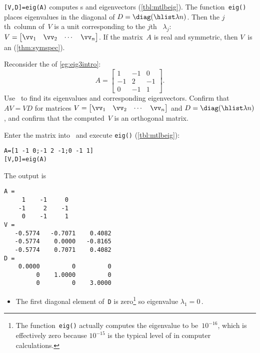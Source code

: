 \begin{compute}
\verb|[V,D]=eig(A)| computes s and eigenvectors (\cref{tbl:mtlbeig}).
The function~\verb|eig()| places eigenvalues in the diagonal of \(D=\diag(\hlist\lambda n)\). 
Then the \(j\)th~column of~\(V\) is a unit  corresponding to the \(j\)th ~\(\lambda_j\):
\(V=\begin{bmatrix} \vv_1&\vv_2&\cdots&\vv_n \end{bmatrix}\).
If the matrix~\(A\) is real and symmetric, then \(V\)~is an  (\cref{thm:symspec}).
\end{compute}

\begin{example} \label{eg:eig3eig}
Reconsider the  of \cref{eg:eig3intro}:
\begin{equation*}
A=\begin{bmatrix} 1&-1&0\\-1&2&-1\\0&-1&1 \end{bmatrix}.
\end{equation*}
Use \script\ to find its eigenvalues and corresponding eigenvectors.
Confirm that \(AV=VD\) for matrices \(V=\begin{bmatrix} \vv_1&\vv_2&\cdots&\vv_n \end{bmatrix}\) and \(D=\diag(\hlist\lambda n)\), and confirm that the computed~\(V\) is an orthogonal matrix.
\begin{solution} 
Enter the matrix into \script\ and execute \verb|eig()| (\cref{tbl:mtlbeig}):
\setbox\ajrqrbox\hbox{}%
\marginajrbox%
\begin{verbatim}
A=[1 -1 0;-1 2 -1;0 -1 1]
[V,D]=eig(A)
\end{verbatim}
The output is
\begin{verbatim}
A =
     1    -1     0
    -1     2    -1
     0    -1     1
V =
   -0.5774   -0.7071    0.4082
   -0.5774    0.0000   -0.8165
   -0.5774    0.7071    0.4082
D =
    0.0000         0         0
         0    1.0000         0
         0         0    3.0000
\end{verbatim}
\begin{itemize}
\item The first diagonal element of~\verb|D| is zero\footnote{The function~\texttt{eig()} actually computes the eigenvalue to be~\(10^{-16}\), which is effectively zero because \(10^{-15}\) is the typical level of  in computer calculations.} so eigenvalue \(\lambda_1=0\)\,.

\end{itemize}
\end{solution}
\end{example}
